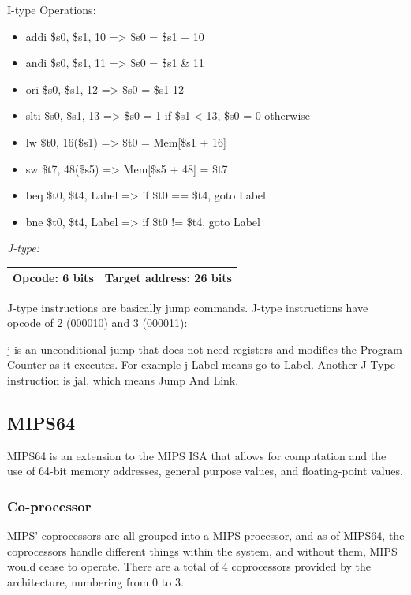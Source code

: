 \documentclass[
    paper=letter,
    parskip=half,
    fontsize=12pt,
    titlepage=firstiscover,
    toc=bibliography,
    numbers=endperiod
]{scrartcl}
\providecommand{\tightlist}{%
  \setlength{\itemsep}{0pt}\setlength{\parskip}{0pt}}
\begin{document}
I-type Operations:

\begin{itemize}
    \tightlist
    \item addi \$s0, \$s1, 10 =\textgreater{} \$s0 = \$s1 + 10
    \item andi \$s0, \$s1, 11 =\textgreater{} \$s0 = \$s1 \& 11
    \item ori \$s0, \$s1, 12 =\textgreater{} \$s0 = \$s1 \textbar{} 12
    \item slti \$s0, \$s1, 13 =\textgreater{} \$s0 = 1 if \$s1 \textless{} 13, \$s0 = 0 otherwise
    \item lw \$t0, 16(\$s1) =\textgreater{} \$t0 = Mem{[}\$s1 + 16{]}
    \item sw \$t7, 48(\$s5) =\textgreater{} Mem{[}\$s5 + 48{]} = \$t7
    \item beq \$t0, \$t4, Label =\textgreater{} if \$t0 == \$t4, goto Label
    \item bne \$t0, \$t4, Label =\textgreater{} if \$t0 != \$t4, goto Label
\end{itemize}

\emph{J-type:}

\begin{tabularx}{\textwidth}{|c|C|}
    \hline
    Opcode: 6 bits & Target address: 26 bits \\
    \hline
\end{tabularx}

J-type instructions are basically jump commands. J-type instructions
have opcode of 2 (000010) and 3 (000011):

j is an unconditional jump that does not need registers and modifies the
Program Counter as it executes. For example j Label means go to Label.
Another J-Type instruction is jal, which means Jump And Link.

\subsection{MIPS64}
\label{sec:mips64}

MIPS64 is an extension to the MIPS ISA that allows for computation and
the use of 64-bit memory addresses, general purpose values, and
floating-point values.

\subsubsection{Co-processor}

MIPS' coprocessors are all grouped into a MIPS processor, and as of
MIPS64, the coprocessors handle different things within the system, and
without them, MIPS would cease to operate. There are a total of 4
coprocessors provided by the architecture, numbering from 0 to 3.
\end{document}
